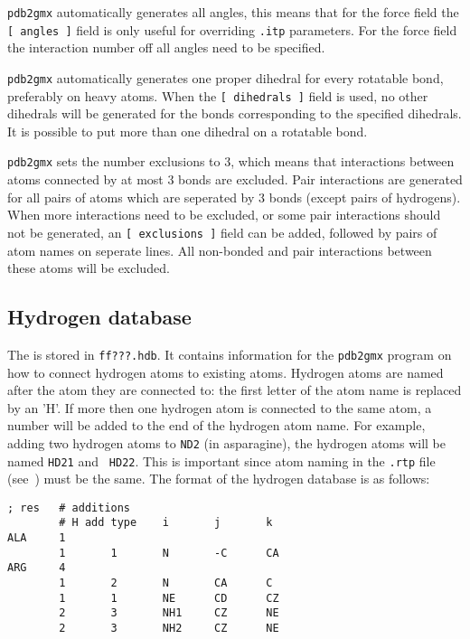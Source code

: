{\tt pdb2gmx} automatically generates all angles, this means that for the
{\gromacs} force field
the {\tt [~angles~]} field is only useful for overriding {\tt .itp}
parameters. For the {} force field the interaction number
off all angles need to be specified.

{\tt pdb2gmx} automatically generates one proper dihedral for every rotatable
bond, preferably on heavy atoms. When the {\tt [~dihedrals~]} field is used,
no other dihedrals will be generated for the bonds corresponding to the
specified  dihedrals. It is possible to put more than one dihedral on a
rotatable bond. 

{\tt pdb2gmx} sets the number exclusions to 3, which
means that interactions between atoms connected by at most 3 bonds are
excluded. Pair interactions are generated for all pairs of atoms which are
seperated by 3 bonds (except pairs of hydrogens).
When more interactions need to be excluded, or some pair interactions should
not be generated, an {\tt [~exclusions~]} field can be added, followed by
pairs of atom names on seperate lines. All non-bonded and pair interactions
between these atoms will be excluded.

\subsection{Hydrogen database}
\label{subsec:hdb}
The  is stored in {\tt ff???.hdb}. It
contains information for the {\tt pdb2gmx} program on how to connect
hydrogen atoms to existing atoms. Hydrogen atoms are named after the
atom they are connected to: the first letter of the atom name is
replaced by an 'H'. If more then one hydrogen atom is connected to the
same atom, a number will be added to the end of the hydrogen atom
name. For example, adding two hydrogen atoms to {\tt ND2} (in
asparagine), the hydrogen atoms will be named {\tt HD21} and {\tt
HD22}. This is important since atom naming in the {\tt .rtp} file
(see~) must be the same. The format of the hydrogen
database is as follows:
%
{\small\begin{verbatim}
; res   # additions
        # H add type    i       j       k
ALA     1
        1       1       N       -C      CA
ARG     4
        1       2       N       CA      C
        1       1       NE      CD      CZ
        2       3       NH1     CZ      NE
        2       3       NH2     CZ      NE
\end{verbatim}
}


